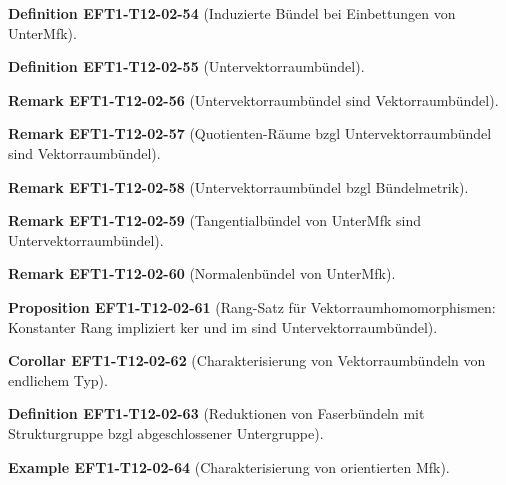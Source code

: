 \documentclass[10pt, letterpaper]{article}
\newcommand{\CustomHeading}[3]{%
  \par\medskip\noindent%
  \textbf{#1 #2} \textnormal{(#3)}.\enskip%
}
\newenvironment{DEF}[2]{\CustomHeading{Definition}{#1}{#2}}{}
\newenvironment{PROP}[2]{\CustomHeading{Proposition}{#1}{#2}}{}
\newenvironment{KORO}[2]{\CustomHeading{Corollar}{#1}{#2}}{}
\newenvironment{REM}[2]{\CustomHeading{Remark}{#1}{#2}}{}
\newenvironment{EXA}[2]{\CustomHeading{Example}{#1}{#2}}{}
\begin{document}
\begin{DEF}{EFT1-T12-02-54}{Induzierte Bündel bei Einbettungen von UnterMfk}
\end{DEF}

\begin{DEF}{EFT1-T12-02-55}{Untervektorraumbündel}
\end{DEF}

\begin{REM}{EFT1-T12-02-56}{Untervektorraumbündel sind Vektorraumbündel}
\end{REM}

\begin{REM}{EFT1-T12-02-57}{Quotienten-Räume bzgl Untervektorraumbündel sind Vektorraumbündel}
\end{REM}

\begin{REM}{EFT1-T12-02-58}{Untervektorraumbündel bzgl Bündelmetrik}
\end{REM}

\begin{REM}{EFT1-T12-02-59}{Tangentialbündel von UnterMfk sind Untervektorraumbündel}
\end{REM}

\begin{REM}{EFT1-T12-02-60}{Normalenbündel von UnterMfk}
\end{REM}

\begin{PROP}{EFT1-T12-02-61}{Rang-Satz für Vektorraumhomomorphismen: Konstanter Rang impliziert ker und im sind Untervektorraumbündel}
\end{PROP}

\begin{KORO}{EFT1-T12-02-62}{Charakterisierung von Vektorraumbündeln von endlichem Typ}
\end{KORO}

\begin{DEF}{EFT1-T12-02-63}{Reduktionen von Faserbündeln mit Strukturgruppe bzgl abgeschlossener Untergruppe}
\end{DEF}

\begin{EXA}{EFT1-T12-02-64}{Charakterisierung von orientierten Mfk}
\end{EXA}
\end{document}
